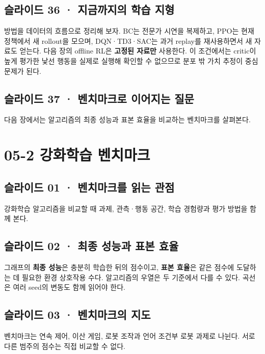 \documentclass[11pt,a4paper]{article}
\begin{document}
\subsection{슬라이드 36 · 지금까지의 학습 지형}

방법을 데이터의 흐름으로 정리해 보자. BC는 전문가 시연을 복제하고, PPO는 현재 정책에서 새 rollout을 모으며, DQN·TD3·SAC는 과거 replay를 재사용하면서 새 자료도 얻는다. 다음 장의 offline RL은 \textbf{고정된 자료만} 사용한다. 이 조건에서는 critic이 높게 평가한 낯선 행동을 실제로 실행해 확인할 수 없으므로 분포 밖 가치 추정이 중심 문제가 된다.\par

\subsection{슬라이드 37 · 벤치마크로 이어지는 질문}

다음 장에서는 알고리즘의 최종 성능과 표본 효율을 비교하는 벤치마크를 살펴본다.\par

\clearpage
\section{05-2 강화학습 벤치마크}


\subsection{슬라이드 01 · 벤치마크를 읽는 관점}

강화학습 알고리즘을 비교할 때 과제, 관측·행동 공간, 학습 경험량과 평가 방법을 함께 본다.\par

\subsection{슬라이드 02 · 최종 성능과 표본 효율}

그래프의 \textbf{최종 성능}은 충분히 학습한 뒤의 점수이고, \textbf{표본 효율}은 같은 점수에 도달하는 데 필요한 환경 상호작용 수다. 알고리즘의 우열은 두 기준에서 다를 수 있다. 곡선은 여러 seed의 변동도 함께 읽어야 한다.\par

\subsection{슬라이드 03 · 벤치마크의 지도}

벤치마크는 연속 제어, 이산 게임, 로봇 조작과 언어 조건부 로봇 과제로 나뉜다. 서로 다른 범주의 점수는 직접 비교할 수 없다.\par
\end{document}
